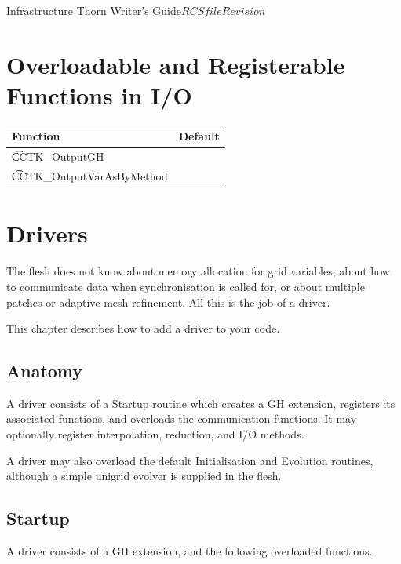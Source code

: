 \begin{cactuspart}{Infrastructure Thorn Writer's Guide}{$RCSfile$}{$Revision$}
\chapter{Overloadable and Registerable Functions in I/O}

 \begin{tabular}{|l|l|}
   \hline {\bf Function} & {\bf Default}   \\
   \hline {\t CCTK\_OutputGH}            & \\
   \hline {\t CCTK\_OutputVarAsByMethod} & \\
   \hline
 \end{tabular}

\chapter{Drivers}

The flesh does not know about memory allocation for grid variables, about how
to communicate data when synchronisation is called for, or about
multiple patches or adaptive mesh refinement.  All this is the job of a driver.

This chapter describes how to add a driver to your code.

\section{Anatomy}

A driver consists of a Startup routine which creates a GH extension, 
registers its associated functions, and overloads the communication functions.
It may optionally register interpolation, reduction, and I/O methods.

A driver may also overload the default Initialisation and Evolution routines,
although a simple unigrid evolver is supplied in the flesh.

\section{Startup}

A driver consists of a GH extension, and the following overloaded
functions.


\end{cactuspart}
